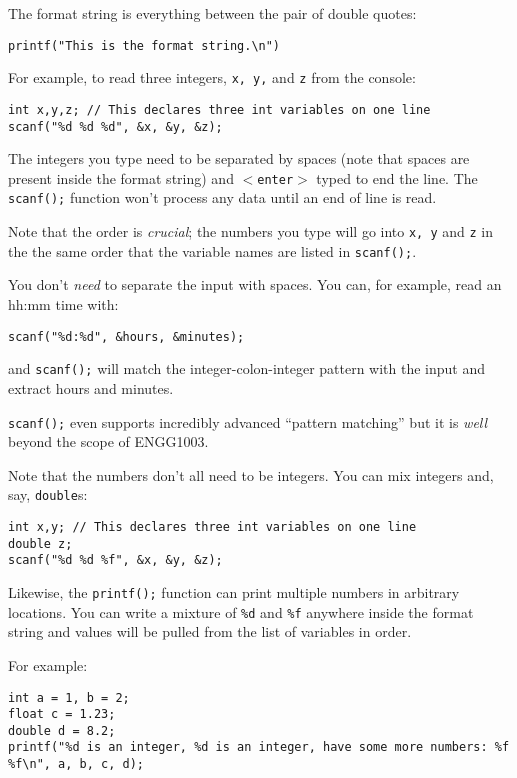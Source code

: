 \documentclass{lab}
\begin{document}
The format string is everything between the pair of double quotes:
\begin{lstlisting}[style=CStyle]
printf("This is the format string.\n")
\end{lstlisting}
For example, to read three integers, \texttt{x, y,} and \texttt{z} from the console:

\begin{lstlisting}[style=CStyle]
int x,y,z; // This declares three int variables on one line
scanf("%d %d %d", &x, &y, &z);
\end{lstlisting}

The integers you type need to be separated by spaces (note that spaces are present inside the format string) and \texttt{$<$enter$>$} typed to end the line. The \texttt{scanf();} function won't process any data until an end of line is read.

Note that the order is \textit{crucial}; the numbers you type will go into \texttt{x, y} and \texttt{z} in the the same order that the variable names are listed in \texttt{scanf();}.

You don't \textit{need} to separate the input with spaces. You can, for example, read an hh:mm time with:

\begin{lstlisting}[style=CStyle]
scanf("%d:%d", &hours, &minutes);
\end{lstlisting}

and \texttt{scanf();} will match the integer-colon-integer pattern with the input and extract hours and minutes.

\texttt{scanf();} even supports incredibly advanced ``pattern matching'' but it is \textit{well} beyond the scope of ENGG1003.

Note that the numbers don't all need to be integers. You can mix integers and, say, \texttt{double}s:

\begin{lstlisting}[style=CStyle]
int x,y; // This declares three int variables on one line
double z;
scanf("%d %d %f", &x, &y, &z);
\end{lstlisting}

Likewise, the \texttt{printf();} function can print multiple numbers in arbitrary locations. You can write a mixture of \texttt{\%d} and \texttt{\%f} anywhere inside the format string and values will be pulled from the list of variables in order.

For example:

\begin{lstlisting}[style=CStyle]
int a = 1, b = 2;
float c = 1.23;
double d = 8.2;
printf("%d is an integer, %d is an integer, have some more numbers: %f %f\n", a, b, c, d);
\end{lstlisting}
\end{document}
